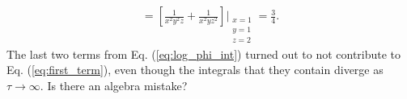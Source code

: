 \documentclass[11pt]{article}
\begin{document}
\begin{align}
    =\left[ \frac{1}{x^2y^2z}+\frac{1}{x^2yz^2}
    \right] \Bigg\vert_{\substack{x=1 \\ y=1 \\ z=2}} = \frac{3}{4}.
\end{align}
The last two terms from Eq. (\ref{eq:log_phi_int}) turned out to not contribute to Eq. (\ref{eq:first_term}), even though the integrals that they contain diverge as $\tau \rightarrow \infty$. Is there an algebra mistake?
\end{document}
